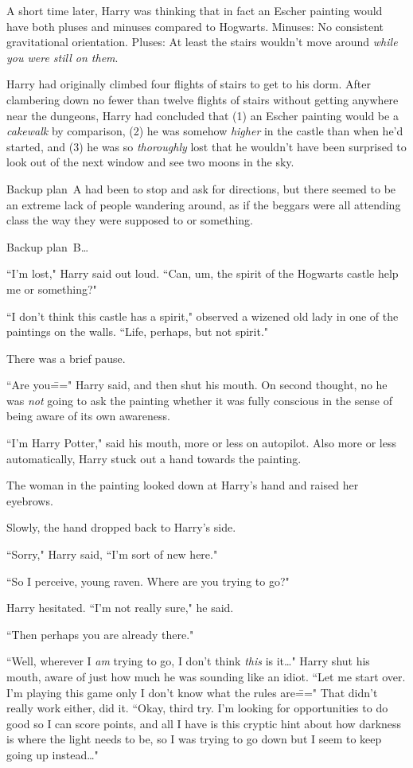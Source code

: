 A short time later, Harry was thinking that in fact an Escher painting would have both pluses and minuses compared to Hogwarts. Minuses: No consistent gravitational orientation. Pluses: At least the stairs wouldn't move around \emph{while you were still on them}.

Harry had originally climbed four flights of stairs to get to his dorm. After clambering down no fewer than twelve flights of stairs without getting anywhere near the dungeons, Harry had concluded that (1) an Escher painting would be a \emph{cakewalk} by comparison, (2) he was somehow \emph{higher} in the castle than when he'd started, and (3) he was so \emph{thoroughly} lost that he wouldn't have been surprised to look out of the next window and see two moons in the sky.

Backup plan~A had been to stop and ask for directions, but there seemed to be an extreme lack of people wandering around, as if the beggars were all attending class the way they were supposed to or something.

Backup plan~B{\ldots}

``I'm lost," Harry said out loud. ``Can, um, the spirit of the Hogwarts castle help me or something?"

``I don't think this castle has a spirit," observed a wizened old lady in one of the paintings on the walls. ``Life, perhaps, but not spirit."

There was a brief pause.

``Are you\===" Harry said, and then shut his mouth. On second thought, no he was \emph{not} going to ask the painting whether it was fully conscious in the sense of being aware of its own awareness.

``I'm Harry Potter," said his mouth, more or less on autopilot. Also more or less automatically, Harry stuck out a hand towards the painting.

The woman in the painting looked down at Harry's hand and raised her eyebrows.

Slowly, the hand dropped back to Harry's side.

``Sorry," Harry said, ``I'm sort of new here."

``So I perceive, young raven. Where are you trying to go?"

Harry hesitated. ``I'm not really sure," he said.

``Then perhaps you are already there."

``Well, wherever I \emph{am} trying to go, I don't think \emph{this} is it{\ldots}" Harry shut his mouth, aware of just how much he was sounding like an idiot. ``Let me start over. I'm playing this game only I don't know what the rules are\===" That didn't really work either, did it. ``Okay, third try. I'm looking for opportunities to do good so I can score points, and all I have is this cryptic hint about how darkness is where the light needs to be, so I was trying to go down but I seem to keep going up instead{\ldots}"

